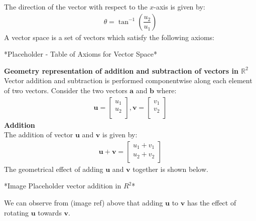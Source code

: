 \noindent The direction of the vector with respect to the $x$-axis is given by: 
\begin{align}
    \theta = \tan^{-1}\left(\dfrac{u_2}{u_1}\right)
\end{align}
A vector space is a set of vectors which satisfy the following axioms:
\begin{center}
    *Placeholder - Table of Axioms for Vector Space*    
\end{center}
\noindent\textbf{Geometry representation of addition and subtraction of vectors in $\mathbb{R}^2$}
Vector addition and subtraction is performed componentwise along each element of two vectors. Consider the two vectors $\textbf{a}$ and $\textbf{b}$ where:
\begin{align}
    \textbf{u} = \begin{bmatrix}
        u_1 \\
        u_2 \\
      \end{bmatrix},
      \textbf{v} = \begin{bmatrix}
        v_1 \\
        v_2 \\
      \end{bmatrix}
\end{align}
\noindent\textbf{Addition} \\
The addition of vector $\textbf{u}$ and $\textbf{v}$ is given by:
\begin{align}
    \textbf{u} + \textbf{v} =
      \begin{bmatrix}
        u_1 + v_1 \\
        u_2 + v_2 \\
      \end{bmatrix}
      \label{eq:addition_vectors}
\end{align}
The geometrical effect of adding $\textbf{u}$ and $\textbf{v}$ together is shown below.
\begin{center}
    *Image Placeholder vector addition in $R^2$*    
\end{center}
We can observe from (image ref) above that adding $\textbf{u}$ to $\textbf{v}$ has the effect of rotating $\textbf{u}$ towards $\textbf{v}$.

